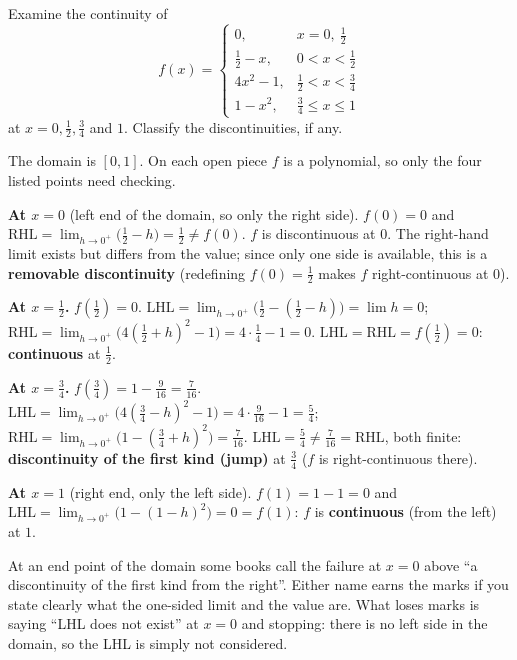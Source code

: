 \begin{example}[DU 2414 Q1(a)(ii)]
Examine the continuity of
\[
f(x)=\begin{cases}0,&x=0,\ \tfrac12\\ \tfrac12-x,&0<x<\tfrac12\\ 4x^2-1,&\tfrac12<x<\tfrac34\\ 1-x^2,&\tfrac34\le x\le1\end{cases}
\]
at $x=0,\frac12,\frac34$ and $1$. Classify the discontinuities, if any.
\end{example}
\begin{solution}
The domain is $[0,1]$. On each open piece $f$ is a polynomial, so only the four listed points need checking.

\textbf{At $x=0$} (left end of the domain, so only the right side). $f(0)=0$ and
$\text{RHL}=\lim_{h\to0^+}\bigl(\tfrac12-h\bigr)=\tfrac12\ne f(0)$.
$f$ is discontinuous at $0$. The right-hand limit exists but differs from the value; since only one side is available, this is a \textbf{removable discontinuity} (redefining $f(0)=\frac12$ makes $f$ right-continuous at $0$).

\textbf{At $x=\frac12$.} $f(\frac12)=0$.
$\text{LHL}=\lim_{h\to0^+}\bigl(\tfrac12-(\tfrac12-h)\bigr)=\lim h=0$;
$\text{RHL}=\lim_{h\to0^+}\bigl(4(\tfrac12+h)^2-1\bigr)=4\cdot\tfrac14-1=0$.
$\text{LHL}=\text{RHL}=f(\frac12)=0$: \textbf{continuous} at $\frac12$.

\textbf{At $x=\frac34$.} $f(\frac34)=1-\frac9{16}=\frac7{16}$.
$\text{LHL}=\lim_{h\to0^+}\bigl(4(\tfrac34-h)^2-1\bigr)=4\cdot\tfrac9{16}-1=\tfrac54$;
$\text{RHL}=\lim_{h\to0^+}\bigl(1-(\tfrac34+h)^2\bigr)=\tfrac7{16}$.
$\text{LHL}=\frac54\ne\frac7{16}=\text{RHL}$, both finite: \textbf{discontinuity of the first kind (jump)} at $\frac34$ ($f$ is right-continuous there).

\textbf{At $x=1$} (right end, only the left side). $f(1)=1-1=0$ and $\text{LHL}=\lim_{h\to0^+}\bigl(1-(1-h)^2\bigr)=0=f(1)$: $f$ is \textbf{continuous} (from the left) at $1$.
\end{solution}
\begin{tipbox}
At an end point of the domain some books call the failure at $x=0$ above ``a discontinuity of the first kind from the right''. Either name earns the marks if you state clearly what the one-sided limit and the value are. What loses marks is saying ``LHL does not exist'' at $x=0$ and stopping: there is no left side in the domain, so the LHL is simply not considered.
\end{tipbox}

